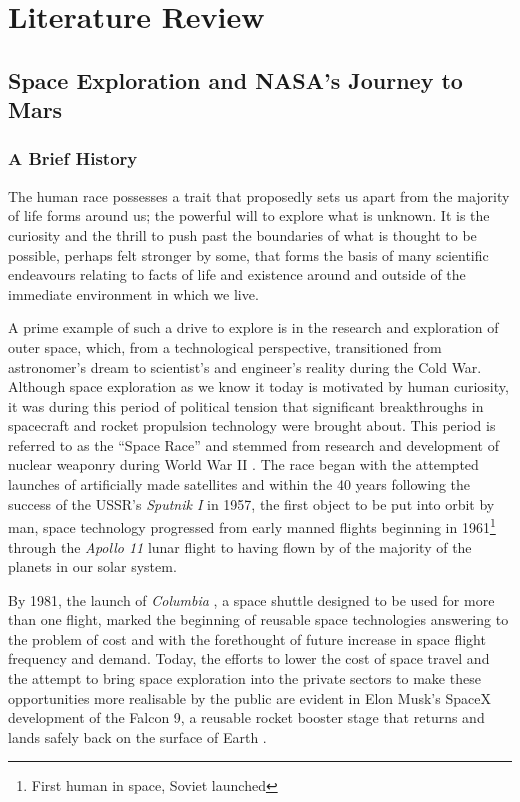 \chapter{Literature Review}
  \section{Space Exploration and NASA's Journey to Mars}
    \subsection{A Brief History}
      The human race possesses a trait that proposedly sets us apart from the majority of life forms around us; the powerful will to explore what is unknown. It is the curiosity and the thrill to push past the boundaries of what is thought to be possible, perhaps felt stronger by some, that forms the basis of many scientific endeavours relating to facts of life and existence around and outside of the immediate environment in which we live.
      
      A prime example of such a drive to explore is in the research and exploration of outer space, which, from a technological perspective, transitioned from astronomer's dream to scientist's and engineer's reality during the Cold War. Although space exploration as we know it today is motivated by human curiosity, it was during this period of political tension that significant breakthroughs in spacecraft and rocket propulsion technology were brought about. This period is referred to as the ``Space Race'' and stemmed from research and development of nuclear weaponry during World War II \cite[p. 147]{cornwell2003hitler}. The race began with the attempted launches of artificially made satellites \cite[pp. 3-5]{schefter1999the} and within the 40 years following the success of the USSR's \textit{Sputnik I} in 1957, the first object to be put into orbit by man, space technology progressed from early manned flights beginning in 1961\footnote{First human in space, Soviet launched} through the \textit{Apollo 11} lunar flight to having flown by of the majority of the planets in our solar system.
      
      By 1981, the launch of \textit{Columbia} \cite{williamharwood2009}, a space shuttle designed to be used for more than one flight, marked the beginning of reusable space technologies answering to the problem of cost and with the forethought of future increase in space flight frequency and demand. Today, the efforts to lower the cost of space travel and the attempt to bring space exploration into the private sectors to make these opportunities more realisable by the public are evident in Elon Musk's SpaceX development of the Falcon 9, a reusable rocket booster stage that returns and lands safely back on the surface of Earth \cite{spacex_popularmechanics}.
      
